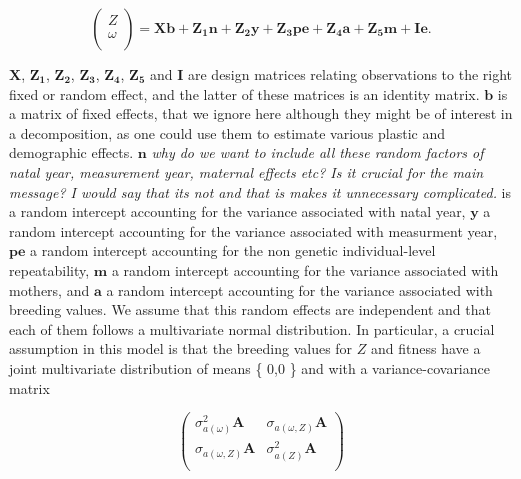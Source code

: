\begin{equation}
\begin{pmatrix}
Z\\
\omega\\
\end{pmatrix}
=\boldsymbol{Xb}+\boldsymbol{Z_1n}+\boldsymbol{Z_2y}+\boldsymbol{Z_3pe}+\boldsymbol{Z_4a}+\boldsymbol{Z_5m}+\boldsymbol{Ie}.
\end{equation}

$\boldsymbol{X}$, $\boldsymbol{Z_1}$, $\boldsymbol{Z_2}$, $\boldsymbol{Z_3}$, $\boldsymbol{Z_4}$, $\boldsymbol{Z_5}$ and $\boldsymbol{I}$ are design matrices relating observations to the right fixed or random effect, and the latter of these matrices is an identity matrix. $\boldsymbol{b}$ is a matrix of fixed effects, that we ignore here although they might be of interest in a decomposition, as one could use them to estimate various plastic and demographic effects. 
$\boldsymbol{n}$ 
\textit{\color{red} why do we want to include all these random factors of natal year, measurement year, maternal effects etc? Is it crucial for the main message? I would say that its not and that is makes it unnecessary complicated.}
is a random intercept accounting for the variance associated with natal year, $\boldsymbol{y}$ a random intercept accounting for the variance associated with measurment year, $\boldsymbol{pe}$ a random intercept accounting for the non genetic individual-level repeatability, $\boldsymbol{m}$ a random intercept accounting for the variance associated with mothers, and $\boldsymbol{a}$ a random intercept accounting for the variance associated with breeding values. We assume that this random effects are independent and that each of them follows a multivariate normal distribution. In particular, a crucial assumption in this model is that the breeding values for $Z$ and fitness have a joint multivariate distribution of means \{ 0,0 \} and with a variance-covariance matrix

\begin{equation}
\begin{pmatrix}
\sigma_{a(\omega)}^2 \boldsymbol{A} & \sigma_{a(\omega,Z)} \boldsymbol{A}\\
\sigma_{a(\omega,Z)} \boldsymbol{A} & \sigma_{a(Z)}^2 \boldsymbol{A}\\
\end{pmatrix}
\end{equation}

